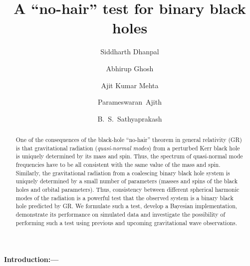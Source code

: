 \documentclass[prl,preprintnumbers,twocolumn,eqsecnum,floatfix,a4paper,nofootinbib,superscriptaddress]{revtex4}
\begin{document}
\title{A ``no-hair'' test for binary black holes}

\author{Siddharth Dhanpal}
\author{Abhirup Ghosh}
\author{Ajit Kumar Mehta}
\author{Parameswaran~Ajith}
\author{B.~S.~Sathyaprakash}

\begin{abstract}
One of the consequences of the black-hole ``no-hair'' theorem in general relativity (GR) is that gravitational radiation (\emph{quasi-normal modes}) from a perturbed Kerr black hole is uniquely determined by its mass and spin. Thus, the spectrum of quasi-normal mode frequencies have to be all consistent with the same value of the mass and spin. Similarly, the gravitational radiation from a coalescing binary black hole system is uniquely determined by a small number of parameters (masses and spins of the black holes and orbital parameters). Thus, consistency between different spherical harmonic modes of the radiation is a powerful test that the observed system is a binary black hole predicted by GR. We formulate such a test, develop a Bayesian implementation, demonstrate its performance on simulated data and investigate the possibility of performing such a test using previous and upcoming gravitational wave observations. 
\end{abstract}
\maketitle
\paragraph{Introduction:---}
\end{document}
